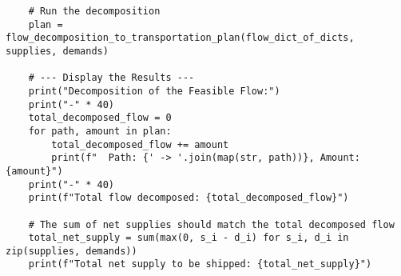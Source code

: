 \begin{verbatim}
    # Run the decomposition
    plan = flow_decomposition_to_transportation_plan(flow_dict_of_dicts, supplies, demands)

    # --- Display the Results ---
    print("Decomposition of the Feasible Flow:")
    print("-" * 40)
    total_decomposed_flow = 0
    for path, amount in plan:
        total_decomposed_flow += amount
        print(f"  Path: {' -> '.join(map(str, path))}, Amount: {amount}")
    print("-" * 40)
    print(f"Total flow decomposed: {total_decomposed_flow}")

    # The sum of net supplies should match the total decomposed flow
    total_net_supply = sum(max(0, s_i - d_i) for s_i, d_i in zip(supplies, demands))
    print(f"Total net supply to be shipped: {total_net_supply}")
\end{verbatim}